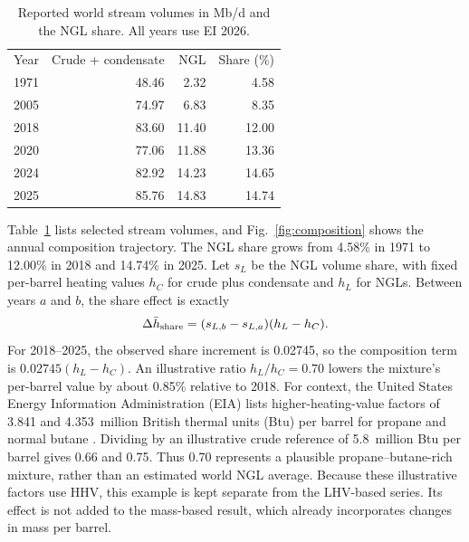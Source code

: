 \documentclass[reprint,aps,pra,longbibliography,floatfix]{revtex4-2}
\begin{document}
\begin{table}[t]
\caption{Reported world stream volumes in Mb/d and the NGL share. All years use EI 2026.}\label{tab:streams}
\begin{ruledtabular}\begin{tabular}{rrrr}
Year & Crude + condensate & NGL & Share (\%)\\
1971 & 48.46 & 2.32 & 4.58 \\
2005 & 74.97 & 6.83 & 8.35 \\
2018 & 83.60 & 11.40 & 12.00 \\
2020 & 77.06 & 11.88 & 13.36 \\
2024 & 82.92 & 14.23 & 14.65 \\
2025 & 85.76 & 14.83 & 14.74 \\
\end{tabular}\end{ruledtabular}\end{table}

Table~\ref{tab:streams} lists selected stream volumes, and Fig.~\ref{fig:composition} shows the annual composition trajectory. The NGL share grows from 4.58\% in 1971 to 12.00\% in 2018 and 14.74\% in 2025. Let $s_L$ be the NGL volume share, with fixed per-barrel heating values $h_C$ for crude plus condensate and $h_L$ for NGLs. Between years $a$ and $b$, the share effect is exactly
\begin{equation}
 \Delta\bar h_{\rm share}=(s_{L,b}-s_{L,a})(h_L-h_C).
 \label{eq:shareeffect}
\end{equation}
For 2018--2025, the observed share increment is 0.02745, so the composition term is $0.02745(h_L-h_C)$. An illustrative ratio $h_L/h_C=0.70$ lowers the mixture's per-barrel value by about 0.85\% relative to 2018. For context, the United States Energy Information Administration (EIA) lists higher-heating-value factors of 3.841 and 4.353~million British thermal units (Btu) per barrel for propane and normal butane \citep{eiaHeat2026}. Dividing by an illustrative crude reference of 5.8~million Btu per barrel gives 0.66 and 0.75. Thus 0.70 represents a plausible propane--butane-rich mixture, rather than an estimated world NGL average. Because these illustrative factors use HHV, this example is kept separate from the LHV-based series. Its effect is not added to the mass-based result, which already incorporates changes in mass per barrel.
\end{document}

